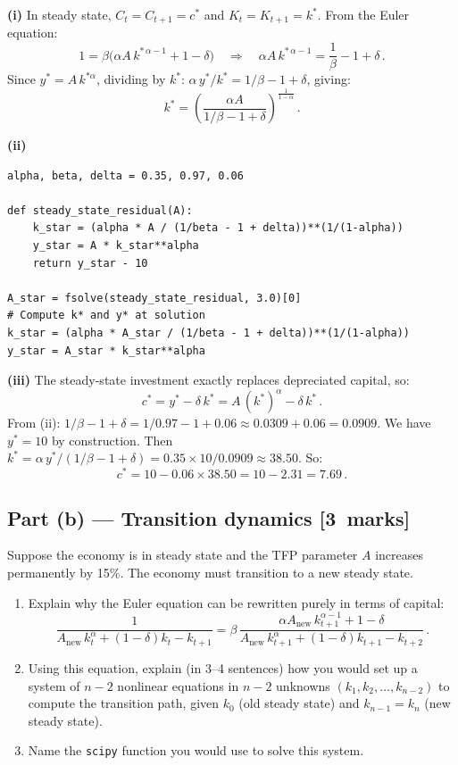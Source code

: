 \documentclass[11pt,a4paper]{article}
\newcommand{\mkpts}[1]{\hfill\textbf{[#1~marks]}}
\begin{document}
\begin{solution}
\textbf{(i)} In steady state, $C_t = C_{t+1} = c^*$ and $K_t = K_{t+1} = k^*$.  From the Euler equation:
\[
1 = \beta\bigl(\alpha A\, k^{*\,\alpha-1} + 1-\delta\bigr) \quad\Longrightarrow\quad \alpha A\, k^{*\,\alpha-1} = \frac{1}{\beta} - 1 + \delta\,.
\]
Since $y^* = A\,k^{*\alpha}$, dividing by $k^*$: $\alpha\,y^*/k^* = 1/\beta - 1 + \delta$, giving:
\[
\boxed{k^* = \left(\frac{\alpha A}{1/\beta - 1 + \delta}\right)^{\frac{1}{1-\alpha}}}\,.
\]

\textbf{(ii)}
\begin{lstlisting}[numbers=none]
alpha, beta, delta = 0.35, 0.97, 0.06

def steady_state_residual(A):
    k_star = (alpha * A / (1/beta - 1 + delta))**(1/(1-alpha))
    y_star = A * k_star**alpha
    return y_star - 10

A_star = fsolve(steady_state_residual, 3.0)[0]
# Compute k* and y* at solution
k_star = (alpha * A_star / (1/beta - 1 + delta))**(1/(1-alpha))
y_star = A_star * k_star**alpha
\end{lstlisting}

\textbf{(iii)} The steady-state investment exactly replaces depreciated capital, so:
\[
c^* = y^* - \delta\,k^* = A\,(k^*)^\alpha - \delta\,k^*\,.
\]
From (ii): $1/\beta - 1 + \delta = 1/0.97 - 1 + 0.06 \approx 0.0309 + 0.06 = 0.0909$.  We have $y^*=10$ by construction.  Then $k^* = \alpha\,y^*/(1/\beta - 1 + \delta) = 0.35 \times 10 / 0.0909 \approx 38.50$.  So:
\[
c^* = 10 - 0.06 \times 38.50 = 10 - 2.31 = \boxed{7.69}\,.
\]
\end{solution}

\subsection*{Part (b) --- Transition dynamics \mkpts{3}}

Suppose the economy is in steady state and the TFP parameter $A$ increases permanently by 15\%.  The economy must transition to a new steady state.

\begin{enumerate}[label=(\roman*),nosep]
\item Explain why the Euler equation can be rewritten purely in terms of capital:
\[
\frac{1}{A_{\text{new}}\,k_t^\alpha + (1-\delta)k_t - k_{t+1}} = \beta\,\frac{\alpha A_{\text{new}}\, k_{t+1}^{\alpha-1} + 1-\delta}{A_{\text{new}}\,k_{t+1}^\alpha + (1-\delta)k_{t+1} - k_{t+2}}\,.
\]
\item Using this equation, explain (in 3--4 sentences) how you would set up a system of $n{-}2$ nonlinear equations in $n{-}2$ unknowns $(k_1, k_2, \ldots, k_{n-2})$ to compute the transition path, given $k_0$ (old steady state) and $k_{n-1} = k_n$ (new steady state).
\item Name the \texttt{scipy} function you would use to solve this system.
\end{enumerate}
\end{document}
